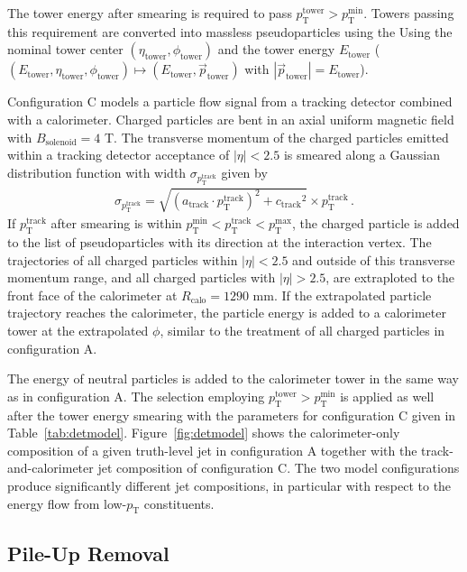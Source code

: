 \documentclass[11pt,letterpaper]{article}
\newcommand{\etower}{\ensuremath{E_{\text{tower}}}}
\newcommand{\etatower}{\ensuremath{\eta_{\text{tower}}}}
\newcommand{\phitower}{\ensuremath{\phi_{\text{tower}}}}
\newcommand{\pt}{\ensuremath{p_{\text{T}}}}
\newcommand{\ptmin}{\ensuremath{p_{\text{T}}^{\text{min}}}}
\newcommand{\ptmax}{\ensuremath{p_{\text{T}}^{\text{max}}}}
\newcommand{\pttrk}{\ensuremath{p_{\text{T}}^{\text{track}}}}
\newcommand{\pttower}{\ensuremath{p_{\text{T}}^{\text{tower}}}}
\newcommand{\atrk}{\ensuremath{a_{\text{track}}}}
\newcommand{\ctrk}{\ensuremath{c_{\text{track}}}}
\begin{document}
The tower energy after smearing is required to pass $\pttower > \ptmin$. 
Towers passing this requirement are converted into massless pseudoparticles using the 
Using the nominal tower center $(\etatower,\phitower)$ and the tower energy \etower{} ($(\etower,\etatower,\phitower) \mapsto (\etower,\vec{p}_{\text{tower}})$ with $|\vec{p}_{\text{tower}}| = \etower$).

Configuration C models a particle flow signal from a tracking detector combined with a calorimeter. 
Charged particles are bent in an axial uniform magnetic field with $B_{\text{solenoid}} = 4$ T.
The transverse momentum of the charged particles emitted within a tracking detector acceptance of $|\eta|<2.5$
is smeared along a Gaussian distribution function with width $\sigma_{\pttrk}$ given by
\begin{align}
  \sigma_{\pttrk} = \sqrt{(\atrk\cdot\pttrk)^{2} + \ctrk^{2}} \times \pttrk\,.
  \label{eq:trkreso}
\end{align} 
If \pttrk{} after smearing is within $\ptmin < \pttrk < \ptmax$, the charged particle is added to the list of pseudoparticles with its direction at the interaction vertex. 
The trajectories of all charged particles within $|\eta| < 2.5$ and outside of this transverse momentum range, 
and all charged particles with $|\eta| > 2.5$, are extraploted to the front face of the calorimeter at $R_{\text{calo}} = 1290$ mm.
If the extrapolated particle trajectory reaches the calorimeter, the particle energy is added to a calorimeter tower at the extrapolated $\phi$, similar to the treatment of all charged particles in configuration A.

The energy of neutral particles is added to the calorimeter tower in the same way as in configuration A. 
The selection employing $\pttower > \ptmin$ is applied as well after the tower energy smearing with the parameters for configuration C given in Table~\ref{tab:detmodel}. 
Figure~\ref{fig:detmodel} shows the calorimeter-only composition of a given truth-level jet in configuration A together with the track-and-calorimeter jet composition of configuration C.
The two model configurations produce significantly different jet compositions, in particular with respect to the energy flow from low-\pt{} constituents.










\subsection{Pile-Up Removal}\label{sec:pu_tech}
\end{document}

